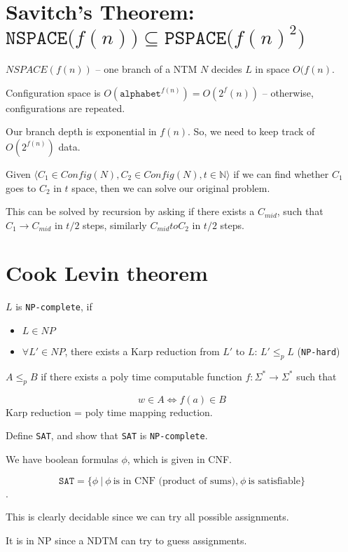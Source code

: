 \section{Savitch's Theorem:  $\texttt{NSPACE($f(n)$)} \subseteq \texttt{PSPACE($f(n)^2$)}$}
$NSPACE(f(n))$ -- one branch of a NTM $N$ decides $L$ in space $O(f(n)$.

Configuration space is $O(\texttt{alphabet}^{f(n)}) = O(2^f(n))$ -- otherwise,
configurations are repeated.

Our branch depth is exponential in $f(n)$. So, we need to keep track of
$O(2^{f(n)})$ data.

Given $\langle C_1 \in Config(N), C_2 \in Config(N), t \in \mathbb{N} \rangle$
if we can find whether $C_1$ goes to $C_2$ in $t$ space, then we can solve
our original problem.

This can be solved by recursion by asking if there exists a $C_{mid}$, such that
$C_1 \to C_{mid}$ in $t/2$ steps, similarly $C_{mid} to C_2$ in $t/2$ steps.


\section{Cook Levin theorem}
$L$ is \texttt{NP-complete}, if 

\begin{itemize}
    \item $L \in NP$
    \item $\forall L' \in NP$, there exists a Karp reduction from $L'$ to $L$: $L' \leq_p L$ (\texttt{NP-hard})
\end{itemize}

$A \leq_p B$ if there exists a poly time computable function $f: \Sigma^* \to
\Sigma^*$ such that 

$$w \in A \Leftrightarrow f(a) \in B$$
Karp reduction = poly time mapping reduction.

Define \texttt{SAT}, and show that \texttt{SAT} is \texttt{NP-complete}.


We have boolean formulas $\phi$, which is given in CNF.

$$\texttt{SAT} = \{ \phi~\vert~\phi~\text{is in CNF (product of sums),}~\phi~\text{is satisfiable} \}$$.

This is clearly decidable since we can try all possible assignments.

It is in NP since a NDTM can try to guess assignments.

